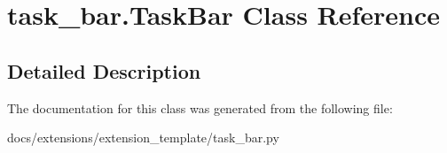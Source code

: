 \hypertarget{classtask__bar_1_1TaskBar}{\section{task\+\_\+bar.\+Task\+Bar Class Reference}
\label{classtask__bar_1_1TaskBar}
}


\subsection{Detailed Description}
\begin{DoxyVerb}\end{DoxyVerb}
 

The documentation for this class was generated from the following file\+:\begin{DoxyCompactItemize}
\item 
docs/extensions/extension\+\_\+template/task\+\_\+bar.\+py\end{DoxyCompactItemize}
